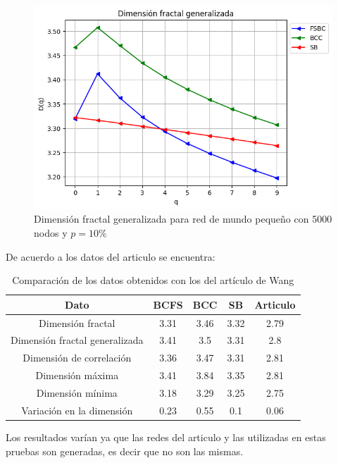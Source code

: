 \begin{figure}[H]
    \centering
    \includegraphics[scale=0.7]{Capitulo4Multifractalidad/imagenes/a_DqsmallWorld4000p10.png}
    \caption{Dimensión fractal generalizada para red de mundo pequeño con 5000 nodos y $p=10\%$}
\end{figure}

De acuerdo a los datos del articulo se encuentra:


\begin{table}[H]
    \centering
    \begin{tabular}{|c|c|c|c|c|}
        \hline
         \textbf{Dato}& \textbf{BCFS} & \textbf{BCC} & \textbf{SB} & \textbf{Articulo} \\
         \hline
         Dimensión fractal &3.31 & 3.46 & 3.32 & 2.79 \\
         \hline
         Dimensión fractal generalizada & 3.41 & 3.5 & 3.31 &2.8  \\
         \hline
         Dimensión de correlación & 3.36 & 3.47 & 3.31 &2.81 \\
         \hline
         Dimensión máxima & 3.41 & 3.84 & 3.35 &2.81 \\
         \hline
         Dimensión mínima & 3.18 & 3.29 & 3.25 &2.75 \\
         \hline
         Variación en la dimensión & 0.23 & 0.55 & 0.1 &0.06 \\
         \hline
    \end{tabular}
    \caption{Comparación de los datos obtenidos con los del artículo de Wang\cite{Wang2012}}
\end{table}

Los resultados varían ya que las redes del articulo y las utilizadas en estas pruebas son generadas, es decir que no son las mismas.

